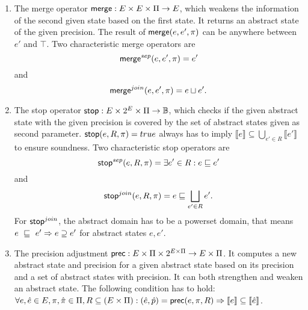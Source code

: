 \begin{enumerate}[leftmargin=*, label=\arabic*.]
\item
The merge operator $\operatorname{\operatorname{\mathsf{merge}}} : E \times E \times \Pi \rightarrow E$, which weakens the information of the second given state based on the first state. It returns an abstract state of the given precision. The result of $\operatorname{\operatorname{\mathsf{merge}}}(e, e', \pi)$ can be anywhere between $e'$ and $\top$.
Two characteristic merge operators are \[\operatorname{\operatorname{\mathsf{merge}}}^{sep}(e, e', \pi) = e'\] and \[\operatorname{\operatorname{\mathsf{merge}}}^{join}(e, e', \pi) = e \sqcup e'.\]

\item
The stop operator $\operatorname{\operatorname{\mathsf{stop}}} : E \times 2^E \times \Pi \rightarrow \mathbb{B}$, which checks if the given abstract state with the given precision is covered by the set of abstract states given as second parameter.
$\operatorname{\operatorname{\mathsf{stop}}}(e, R, \pi) = true$ always has to imply $\llbracket e \rrbracket \subseteq \bigcup_{e' \in R} \llbracket e' \rrbracket$ to ensure soundness.
Two characteristic stop operators are \[\operatorname{\operatorname{\mathsf{stop}}}^{sep}(e, R, \pi) = \exists e' \in R : e \sqsubseteq e'\] and \[\operatorname{\operatorname{\mathsf{stop}}}^{join}(e, R, \pi) = e \sqsubseteq \bigsqcup\limits_{e' \in R} e'.\]
For $\operatorname{\operatorname{\mathsf{stop}}}^{join}$, the abstract domain has to be a powerset domain, that means $e~\sqsubseteq~e' \Rightarrow e \supseteq e'$ for abstract states $e, e'$.

\item
The precision adjustment $\operatorname{\operatorname{\mathsf{prec}}} : E \times \Pi \times 2^{E \times \Pi} \rightarrow E \times \Pi$. It computes a new abstract state and precision for a given abstract state based on its precision and a set of abstract states with precision.
It can both strengthen and weaken an abstract state.
The following condition has to hold: $\forall e, \hat{e} \in E, \pi, \hat{\pi} \in \Pi, R \subseteq (E \times \Pi) : (\hat{e}, \hat{p}) = \operatorname{\operatorname{\mathsf{prec}}}(e, \pi, R) \Rightarrow \llbracket e \rrbracket \subseteq \llbracket \hat{e} \rrbracket$.

\end{enumerate} 

